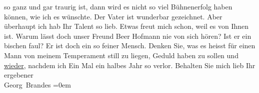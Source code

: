 \begin{ledgroupsized}[t]{13cm}
               so ganz und gar traurig ist,
                    dann wird es nicht so viel Bühnenerfolg haben können, {\pb}wie ich es wünschte. Der
                    Vater ist wunderbar gezeichnet. Aber überhaupt ich hab Ihr Talent so lieb. Etwas
                    freut mich schon, weil es von Ihnen ist.\pend
           \pstart
           Warum lässt doch unser Freund Beer Hofmann
                    nie von sich hören? Ist er ein bischen faul? Er ist doch ein so feiner
                    Mensch.\pend
           \pstart
           Denken Sie, was es heisst für einen Mann von meinem Temperament still zu liegen,
                    Geduld haben zu sollen und \uline{wieder}, nachdem ich
                    Ein Mal ein halbes Jahr so verlor.\pend
           \pstart
           Behalten Sie mich lieb\pend
           \pstart
           Ihr ergebener{\\[\baselineskip]}\spacefill\mbox{Georg Brandes}\pend
           \leftskip=0em{}
         
         \endnumbering{}\end{ledgroupsized}  \newcommand{\dateiname}{L00876}\newcommand{\titel}{Georg Brandes an Arthur Schnitzler, 7. 1. 1899}\newcommand{\editorInnen}{Martin Anton Müller und Gerd-Hermann Susen}
      